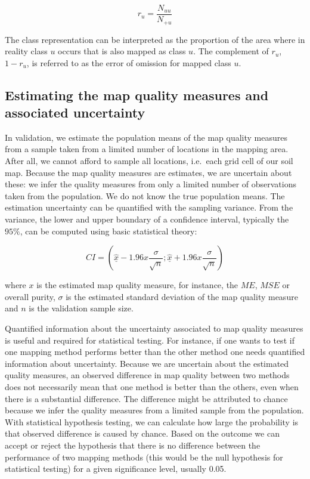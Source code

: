 \documentclass[10pt,b5paper,]{book}
\theoremstyle{definition}
\theoremstyle{definition}
\theoremstyle{definition}
\theoremstyle{remark}
\begin{document}
\begin{equation}
r_u = \frac{ N_{uu}}{N_{+u}}
\end{equation}

The class representation can be interpreted as the proportion of the
area where in reality class \(u\) occurs that is also mapped as class
\(u\). The complement of \(r_u\), \(1 - r_u\), is referred to as the
error of omission for mapped class \(u\).

\hypertarget{estimating-the-map-quality-measures-and-associated-uncertainty}{%
\subsection{Estimating the map quality measures and associated
uncertainty}\label{estimating-the-map-quality-measures-and-associated-uncertainty}}

In validation, we estimate the population means of the map quality
measures from a sample taken from a limited number of locations in the
mapping area. After all, we cannot afford to sample all locations,
i.e.~each grid cell of our soil map. Because the map quality measures
are estimates, we are uncertain about these: we infer the quality
measures from only a limited number of observations taken from the
population. We do not know the true population means. The estimation
uncertainty can be quantified with the sampling variance. From the
variance, the lower and upper boundary of a confidence interval,
typically the \(95\%\), can be computed using basic statistical theory:

\begin{equation}
CI = (\underline{\hat{x}} - 1.96x \frac{\sigma}{\sqrt{n} } ; \underline{\hat{x}} + 1.96x \frac{\sigma}{\sqrt{n} })
\end{equation}

where \(x\) is the estimated map quality measure, for instance, the
\(ME\), \(MSE\) or overall purity, \(\sigma\) is the estimated standard
deviation of the map quality measure and \(n\) is the validation sample
size.

Quantified information about the uncertainty associated to map quality
measures is useful and required for statistical testing. For instance,
if one wants to test if one mapping method performs better than the
other method one needs quantified information about uncertainty. Because
we are uncertain about the estimated quality measures, an observed
difference in map quality between two methods does not necessarily mean
that one method is better than the others, even when there is a
substantial difference. The difference might be attributed to chance
because we infer the quality measures from a limited sample from the
population. With statistical hypothesis testing, we can calculate how
large the probability is that observed difference is caused by chance.
Based on the outcome we can accept or reject the hypothesis that there
is no difference between the performance of two mapping methods (this
would be the null hypothesis for statistical testing) for a given
significance level, usually 0.05.
\end{document}
